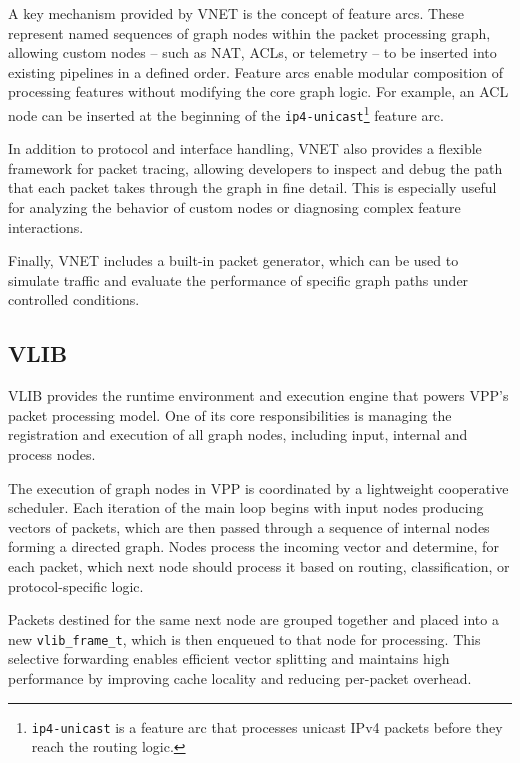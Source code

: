 A key mechanism provided by VNET is the concept of feature arcs. 
These represent named sequences of graph nodes within the packet processing graph, allowing custom nodes -- such as NAT, ACLs, or telemetry -- to be inserted into existing pipelines in a defined order. 
Feature arcs enable modular composition of processing features without modifying the core graph logic. For example, an ACL node can be inserted at the beginning of the 
\texttt{ip4-unicast}\footnote{\texttt{ip4-unicast} is a feature arc that processes unicast IPv4 packets before they reach the routing logic.} feature arc.

In addition to protocol and interface handling, VNET also provides a flexible framework for packet tracing, 
allowing developers to inspect and debug the path that each packet takes through the graph in fine detail. 
This is especially useful for analyzing the behavior of custom nodes or diagnosing complex feature interactions.

Finally, VNET includes a built-in packet generator, which can be used to simulate traffic and evaluate the performance of specific graph paths under 
controlled conditions.\cite{fdio-vpp-vnet-2506, fdio-vpp-featurearcs-2506}

\subsection{VLIB}
VLIB provides the runtime environment and execution engine that powers VPP’s packet processing model.
One of its core responsibilities is managing the registration and execution of all graph nodes, including input, internal and process nodes.

The execution of graph nodes in VPP is coordinated by a lightweight cooperative scheduler.
Each iteration of the main loop begins with input nodes producing vectors of packets, which are then passed through a sequence of internal nodes forming a directed graph.
Nodes process the incoming vector and determine, for each packet, which next node should process it based on routing, classification, or protocol-specific logic.

Packets destined for the same next node are grouped together and placed into a new \texttt{vlib\_frame\_t}, which is then enqueued to that node for processing.
This selective forwarding enables efficient vector splitting and maintains high performance by improving cache locality and reducing per-packet overhead.

